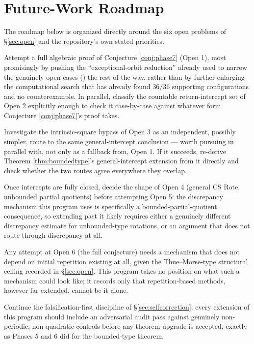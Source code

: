 \documentclass[11pt]{article}
\newcommand{\repo}[1]{\text{\texttt{#1}}}
\begin{document}
\section{Future-Work Roadmap}
\label{sec:roadmap}

The roadmap below is organized directly around the six open problems of \S\ref{sec:open} and the repository's own stated priorities.

\begin{description}[leftmargin=3em,style=nextline]
\item[Near term (directly attackable with current machinery).] Attempt a full algebraic proof of Conjecture \ref{conj:phase7} (Open 1), most promisingly by pushing the ``exceptional-orbit reduction'' already used to narrow the genuinely open cases (\repo{theorems/phase7/PHASE7\_VERDICT.md}) the rest of the way, rather than by further enlarging the computational search that has already found $36/36$ supporting configurations and no counterexample. In parallel, classify the countable return-intercept set of Open 2 explicitly enough to check it case-by-case against whatever form Conjecture \ref{conj:phase7}'s proof takes.
\item[Medium term.] Investigate the intrinsic-square bypass of Open 3 as an independent, possibly simpler, route to the same general-intercept conclusion --- worth pursuing in parallel with, not only as a fallback from, Open 1. If it succeeds, re-derive Theorem \ref{thm:boundedtype}'s general-intercept extension from it directly and check whether the two routes agree everywhere they overlap.
\item[Longer term.] Once intercepts are fully closed, decide the shape of Open 4 (general CS Rote, unbounded partial quotients) before attempting Open 5: the discrepancy mechanism this program uses is specifically a bounded-partial-quotient consequence, so extending past it likely requires either a genuinely different discrepancy estimate for unbounded-type rotations, or an argument that does not route through discrepancy at all.
\item[Structural.] Any attempt at Open 6 (the full conjecture) needs a mechanism that does not depend on initial repetition existing at all, given the Thue--Morse-type structural ceiling recorded in \S\ref{sec:open}. This program takes no position on what such a mechanism could look like; it records only that repetition-based methods, however far extended, cannot be it alone.
\item[Process.] Continue the falsification-first discipline of \S\ref{sec:selfcorrection}: every extension of this program should include an adversarial audit pass against genuinely non-periodic, non-quadratic controls before any theorem upgrade is accepted, exactly as Phases 5 and 6 did for the bounded-type theorem.
\end{description}
\end{document}
